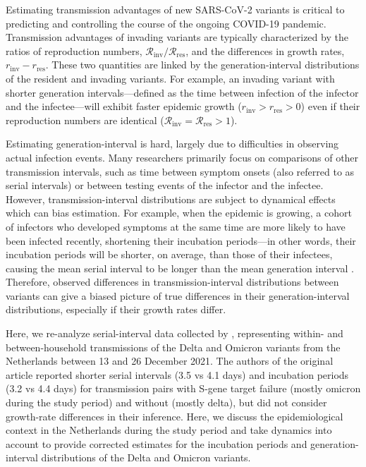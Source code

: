 \documentclass[12pt]{article}
\newcommand{\Rx}[1]{\ensuremath{{\mathcal R}_{#1}}\xspace}
\newcommand{\Rres}{\Rx{\mathrm{res}}}
\newcommand{\Rinv}{\Rx{\mathrm{inv}}}
\newcommand{\rx}[1]{\ensuremath{{r}_{#1}}\xspace}
\newcommand{\rres}{\rx{\mathrm{res}}}
\newcommand{\rinv}{\rx{\mathrm{inv}}}
\begin{document}
Estimating transmission advantages of new SARS-CoV-2 variants is critical to predicting and controlling the course of the ongoing COVID-19 pandemic.
Transmission advantages of invading variants are typically characterized by the ratios of reproduction numbers, $\Rinv/\Rres$, and the differences in growth rates, $\rinv-\rres$.
These two quantities are linked by the generation-interval distributions of the resident and invading variants.
For example, an invading variant with shorter generation intervals---defined as the time between infection of the infector and the infectee---will exhibit faster epidemic growth ($\rinv > \rres > 0$) even if their reproduction numbers are identical ($\Rinv = \Rres > 1$).

Estimating generation-interval is hard, largely due to difficulties in observing actual infection events.
Many researchers primarily focus on comparisons of other transmission intervals, such as time between symptom onsets (also referred to as serial intervals) or between testing events \citep{abbott2022test} of the infector and the infectee.
However, transmission-interval distributions are subject to dynamical effects which can bias estimation.
For example, when the epidemic is growing, a cohort of infectors who developed symptoms at the same time are more likely to have been infected recently, shortening their incubation periods---in other words, their incubation periods will be shorter, on average, than those of their infectees, causing the mean serial interval to be longer than the mean generation interval \citep{park2021forward}.
Therefore, observed differences in transmission-interval distributions between variants can give a biased picture of true differences in their generation-interval distributions, especially if their growth rates differ.

Here, we re-analyze serial-interval data collected by \citep{backer2021omicron}, representing within- and between-household transmissions of the Delta and Omicron variants from the Netherlands between 13 and 26 December 2021.
The authors of the original article reported shorter serial intervals (3.5 vs 4.1 days) and incubation periods (3.2 vs 4.4 days) for transmission pairs with S-gene target failure (mostly omicron during the study period) and without (mostly delta), but did not consider growth-rate differences in their inference.
Here, we discuss the epidemiological context in the Netherlands during the study period and take dynamics into account to provide corrected estimates for the incubation periods and generation-interval distributions of the Delta and Omicron variants.
\end{document}
